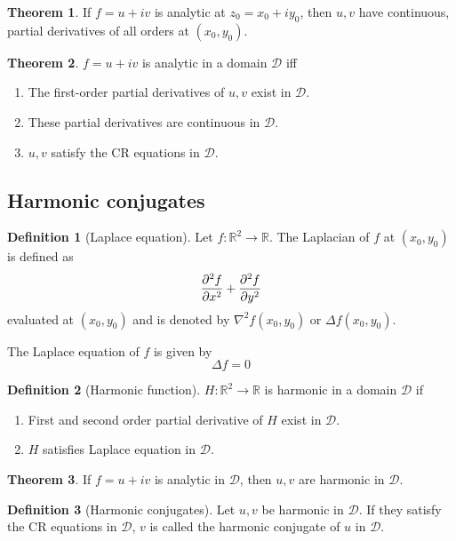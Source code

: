 \documentclass[10pt, a4paper]{extarticle}
\theoremstyle{definition}
\newtheorem{thm}{Theorem}
\newtheorem{defn}{Definition}
\begin{document}
	\begin{thm}\label{highorder}
		If $f=u+iv$ is analytic at $z_0=x_0+iy_0$, then $u,v$ have continuous, partial derivatives of all orders at $(x_0,y_0)$.
	\end{thm}

	\begin{thm}
		$f=u+iv$ is analytic in a domain $\mathscr{D}$ iff
		\begin{enumerate}
			\item The first-order partial derivatives of $u,v$ exist in $\mathscr{D}$.
			\item These partial derivatives are continuous in $\mathscr{D}$.
			\item $u,v$ satisfy the CR equations in $\mathscr{D}$.
	\end{enumerate}
	\end{thm}

	\subsection{Harmonic conjugates}
	\begin{defn}[Laplace equation]
		Let $f:\mathbb{R}^2\to\mathbb{R}$. The Laplacian of $f$ at $(x_0,y_0)$ is defined as
		\[\pdv[2]{f}{x}+\pdv[2]{f}{y}\]
		evaluated at $(x_0,y_0)$ and is denoted by $\nabla^2f(x_0,y_0)$ or $\Delta f(x_0,y_0)$.

		The Laplace equation of $f$ is given by
		\[\Delta f=0\]
	\end{defn}

	\begin{defn}[Harmonic function]
		$H:\mathbb{R}^2\to\mathbb{R}$ is harmonic in a domain $\mathscr{D}$ if
		\begin{enumerate}
			\item First and second order partial derivative of $H$ exist in $\mathscr{D}$.
			\item $H$ satisfies Laplace equation in $\mathscr{D}$.
	\end{enumerate}
	\end{defn}

	\begin{thm}
		If $f=u+iv$ is analytic in $\mathscr{D}$, then $u,v$ are harmonic in $\mathscr{D}$.
	\end{thm}

	\begin{defn}[Harmonic conjugates]
		Let $u,v$ be harmonic in $\mathscr{D}$. If they satisfy the CR equations in $\mathscr{D}$, $v$ is called the harmonic conjugate of $u$ in $\mathscr{D}$.
	\end{defn}
	
\end{document}
